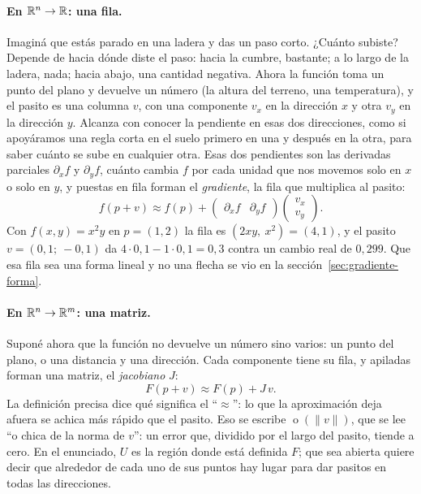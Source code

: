 \paragraph{En \(\mathbb{R}^n\to\mathbb{R}\): una fila.} Imaginá que estás parado en una ladera y das un paso
corto. ¿Cuánto subiste? Depende de hacia dónde diste el paso: hacia la cumbre, bastante; a lo
largo de la ladera, nada; hacia abajo, una cantidad negativa. Ahora la función toma un punto
del plano y devuelve un número (la altura del terreno, una temperatura), y el pasito es una
columna \(v\), con una componente \(v_x\) en la dirección \(x\) y otra \(v_y\) en la dirección
\(y\). Alcanza con conocer la pendiente en esas dos direcciones, como si apoyáramos una regla
corta en el suelo primero en una y después en la otra, para saber cuánto se sube en cualquier
otra. Esas dos pendientes son las derivadas parciales \(\partial_xf\) y \(\partial_yf\), cuánto
cambia \(f\) por cada unidad que nos movemos solo en \(x\) o solo en \(y\), y puestas en fila
forman el \emph{gradiente}, la fila que multiplica al pasito:
\[
  f(p+v)\approx f(p)+\begin{pmatrix}\partial_xf&\partial_yf\end{pmatrix}
  \begin{pmatrix}v_x\\v_y\end{pmatrix}.
\]
Con \(f(x,y)=x^2y\) en \(p=(1,2)\) la fila es \((2xy,\ x^2)=(4,1)\), y el pasito
\(v=(0{,}1;\ -0{,}1)\) da \(4\cdot0{,}1-1\cdot0{,}1=0{,}3\) contra un cambio real de
\(0{,}299\). Que esa fila sea una forma lineal y no una flecha se vio en la
sección~\ref{sec:gradiente-forma}.

\paragraph{En \(\mathbb{R}^n\to\mathbb{R}^m\): una matriz.} Suponé ahora que la función no devuelve un número
sino varios: un punto del plano, o una distancia y una dirección. Cada componente tiene su
fila, y apiladas forman una matriz, el \emph{jacobiano} \(J\):
\[
  F(p+v)\approx F(p)+J\,v .
\]
La definición precisa dice qué significa el \enquote{\(\approx\)}: lo que la aproximación deja
afuera se achica más rápido que el pasito. Eso se escribe \(\operatorname{o}(\lVert v\rVert)\),
que se lee \enquote{o chica de la norma de \(v\)}: un error que, dividido por el largo del
pasito, tiende a cero. En el enunciado, \(U\) es la región donde está definida \(F\); que sea
abierta quiere decir que alrededor de cada uno de sus puntos hay lugar para dar pasitos en
todas las direcciones.

